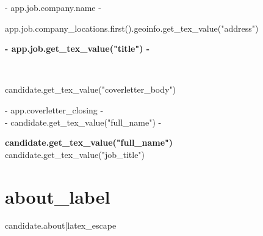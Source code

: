 \documentclass[a4paper, 12pt]{report}
\begin{document}
\vspace{10mm}
{%
{{- app.job.company.name -}} \\
{%
{{ app.job.company_locations.first().geoinfo.get_tex_value("address") }}
{%

\begin{center}
\textbf{ {{- app.job.get_tex_value("title") -}} }\\
\vspace{15mm}
\end{center}

\\

\vspace{-3mm}\setlength\parindent{24pt}

{{ candidate.get_tex_value("coverletter_body") }}

\vspace{5mm}

\vspace{10mm}

\begin{flushleft}
{{- app.coverletter_closing -}}\\
{{- candidate.get_tex_value("full_name") -}}\\
\vspace{3mm}

\end{flushleft}

\pagebreak

\begin{center}
  \textbf{\Huge {{ candidate.get_tex_value("full_name") }}} \\
  \vspace{2mm}
   {{ candidate.get_tex_value("job_title") }}
\end{center}

\vspace{4mm}

{%
\space
\section*{ {{ about_label }} }
{{ candidate.about|latex_escape }}
{%

}}}}}
\end{document}
